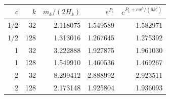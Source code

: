 \begin{tabular}{rrrrr}\toprule
$c$ & $k$ & $m_k/(2H_k)$ & $e^{P_1}$ & $e^{P_1+cw^5/(6k^2)}$ \\\midrule
1/2 & 32 & 2.118075 & 1.549589 & 1.582971 \\
1/2 & 128 & 1.313016 & 1.267645 & 1.275392 \\
1 & 32 & 3.222888 & 1.927875 & 1.961030 \\
1 & 128 & 1.549910 & 1.460536 & 1.469267 \\
2 & 32 & 8.299412 & 2.888992 & 2.923511 \\
2 & 128 & 2.173148 & 1.925804 & 1.936093 \\
\bottomrule\end{tabular}
